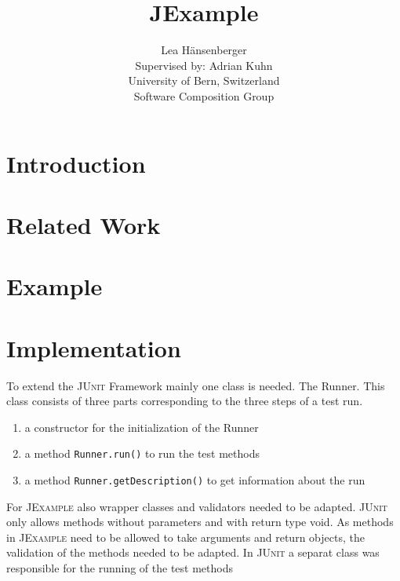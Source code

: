 \documentclass[11pt]{article}
\newcommand{\JUnit}{\textsc{JUnit}\xspace}
\newcommand{\JExample}{\textsc{JExample}\xspace}
\begin{document}
\title{JExample}

\author{Lea H\"ansenberger\\
	Supervised by: Adrian Kuhn\\
	University of Bern, Switzerland\\
	Software Composition Group
}

\maketitle

\begin{abstract}

\end{abstract}

\section{Introduction}
 
\section{Related Work}

\section{Example}

\section{Implementation}

To extend the \JUnit Framework mainly one class is needed. The Runner. This class consists of three parts corresponding to the three steps of a test run.

\begin{enumerate}
 \item a constructor for the initialization of the Runner
 \item a method \verb|Runner.run()| to run the test methods
 \item a method \verb|Runner.getDescription()| to get information about the run
\end{enumerate}
For \JExample also wrapper classes and validators needed to be adapted. \JUnit only allows methods without parameters and with return type void. As methods in \JExample need to be allowed to take arguments and return objects, the validation of the methods needed to be adapted.
In \JUnit a separat class was responsible for the running of the test methods
\end{document}
